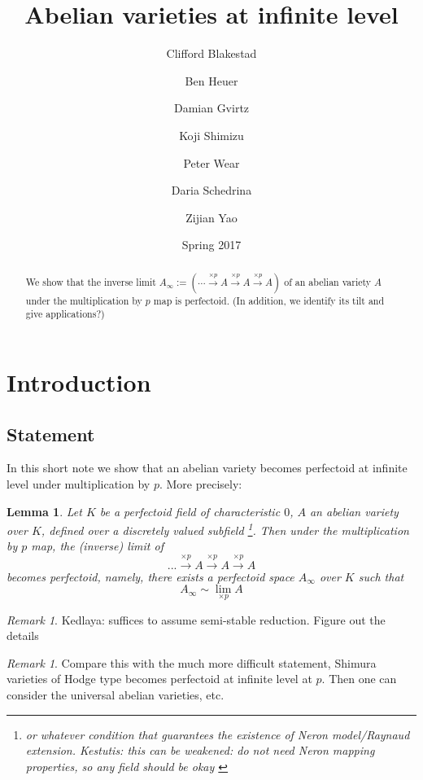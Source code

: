 \documentclass[11pt,oneside]{amsart}
\title[Abelian varieties at infinite level]{Abelian varieties at infinite level}
\date{Spring 2017}
\author{
Clifford Blakestad \and
Ben Heuer \and 
Damian Gvirtz \and
Koji Shimizu \and 
Peter Wear \and
Daria Schedrina \and
Zijian Yao}
\theoremstyle{theorem}
\newtheorem{lemma}[theorem]{Lemma}
\theoremstyle{definition}
\theoremstyle{remark}
\newtheorem{remark}[theorem]{Remark}
\begin{document}
	
\maketitle

\begin{abstract}
We show that the inverse limit  $A_\infty := ( \cdots \xrightarrow{\times p } A \xrightarrow{\times p } A \xrightarrow{\times p } A )$ of an abelian variety $A$ under the multiplication by $p$ map is perfectoid. (In addition, we identify its tilt and give applications?)
\end{abstract}

\section{Introduction}
	
\subsection{Statement}
In this short note we show that an abelian variety becomes perfectoid at infinite level under multiplication by $p$. More precisely:
\begin{lemma} \label{main_lemma}
Let $K$ be a perfectoid field of characteristic $0$, $A$ an abelian variety over $K$, defined over a discretely valued subfield \footnote{or whatever condition that guarantees the existence of Neron model/Raynaud extension. { \color{red} Kestutis: this can be weakened: do not need Neron mapping properties, so any field should be okay } }. Then  under the multiplication by $p$ map, the (inverse) limit of 
$$ ... \xrightarrow{\times p} A \xrightarrow{\times p} A \xrightarrow{\times p} A   $$
becomes perfectoid, namely, there exists a perfectoid space $A_\infty$ over $K$ such that 
$$A_\infty \sim \lim_{\times p} A$$
\end{lemma}


\begin{remark}
{\color{red} Kedlaya: suffices to assume semi-stable reduction. Figure out the details } %
\end{remark}

\begin{remark}
 Compare this with the much more difficult statement, Shimura varieties of Hodge type becomes perfectoid at infinite level at $p$. Then one can consider the universal abelian varieties, etc. 
\end{remark}
\end{document}
